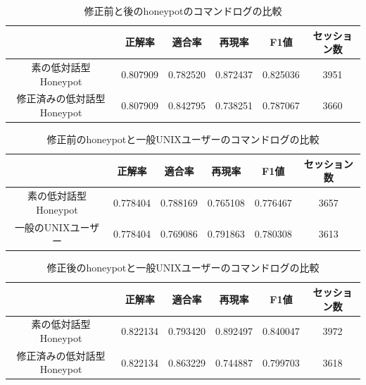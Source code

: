 \vspace{7mm}
\setlength{\myheighta}{10mm}
\begin{table}[h]
 \caption{修正前と後のhoneypotのコマンドログの比較}
 \label{table:scdvcompare1}
 \centering
  \begin{tabular}{|c||c|c|c|c|c|}
   \hline
   \parbox[c][\myheighta][c]{0cm}{}  & 正解率 & 適合率 & 再現率 & F1値 & セッション数\\
   \hline \hline 
     \parbox[c][\myheighta][c]{0cm}{} 素の低対話型Honeypot  & 0.807909 & 0.782520 & 0.872437 & 0.825036 & 3951\\
     \hline
     \parbox[c][\myheighta][c]{0cm}{} 修正済みの低対話型Honeypot  & 0.807909 & 0.842795 & 0.738251 & 0.787067 & 3660\\
     \hline
  \end{tabular}
\end{table}
\vspace{7mm}
\vspace{7mm}
\setlength{\myheighta}{10mm}
\begin{table}[h]
 \caption{修正前のhoneypotと一般UNIXユーザーのコマンドログの比較}
 \label{table:scdvcompare2}
 \centering
  \begin{tabular}{|c||c|c|c|c|c|}
   \hline
   \parbox[c][\myheighta][c]{0cm}{}  & 正解率 & 適合率 & 再現率 & F1値 & セッション数\\
   \hline \hline 
     \parbox[c][\myheighta][c]{0cm}{} 素の低対話型Honeypot  & 0.778404 & 0.788169 & 0.765108 & 0.776467 & 3657\\
     \hline
     \parbox[c][\myheighta][c]{0cm}{} 一般のUNIXユーザー  & 0.778404 & 0.769086 & 0.791863 & 0.780308 & 3613\\
     \hline
  \end{tabular}
\end{table}
\vspace{7mm}
\vspace{7mm}
\setlength{\myheighta}{10mm}
\begin{table}[h]
 \caption{修正後のhoneypotと一般UNIXユーザーのコマンドログの比較}
 \label{table:scdvcompare3}
 \centering
  \begin{tabular}{|c||c|c|c|c|c|}
   \hline
   \parbox[c][\myheighta][c]{0cm}{}  & 正解率 & 適合率 & 再現率 & F1値 & セッション数\\
   \hline \hline 
     \parbox[c][\myheighta][c]{0cm}{} 素の低対話型Honeypot  & 0.822134 & 0.793420 & 0.892497 & 0.840047 & 3972\\
     \hline
     \parbox[c][\myheighta][c]{0cm}{} 修正済みの低対話型Honeypot  & 0.822134 & 0.863229 & 0.744887 & 0.799703 & 3618\\
     \hline
  \end{tabular}
\end{table}
\vspace{7mm}

